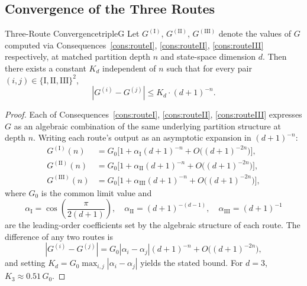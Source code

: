 \subsection{Convergence of the Three Routes}
\label{sec:ch20-convergence}
\label{sec:Grelation}

\begin{consequence}{Three-Route Convergence}{tripleG}
  Let $G^{(\mathrm{I})}$, $G^{(\mathrm{II})}$, $G^{(\mathrm{III})}$ denote the
  values of $G$ computed via Consequences~\ref{cons:routeI}, \ref{cons:routeII},
  \ref{cons:routeIII} respectively, at matched partition depth $n$ and
  state-space dimension $d$.
  Then there exists a constant $K_{d}$ independent of $n$ such that for every
  pair $(i,j) \in \{\mathrm{I},\mathrm{II},\mathrm{III}\}^{2}$,
  \begin{equation}\label{eq:tripleconvergence}
    \left|G^{(i)} - G^{(j)}\right| \leq K_{d}\cdot(d+1)^{-n}.
  \end{equation}
\end{consequence}

\begin{proof}
Each of Consequences~\ref{cons:routeI}, \ref{cons:routeII}, \ref{cons:routeIII}
expresses $G$ as an algebraic combination of the same underlying partition
structure at depth $n$.
Writing each route's output as an asymptotic expansion in $(d+1)^{-n}$:
\begin{align}
G^{(\mathrm{I})}(n) &= G_{0}\bigl[1+\alpha_{\mathrm{I}}(d+1)^{-n}
                      + O\!\bigl((d+1)^{-2n}\bigr)\bigr],\\
G^{(\mathrm{II})}(n) &= G_{0}\bigl[1+\alpha_{\mathrm{II}}(d+1)^{-n}
                       + O\!\bigl((d+1)^{-2n}\bigr)\bigr],\\
G^{(\mathrm{III})}(n) &= G_{0}\bigl[1+\alpha_{\mathrm{III}}(d+1)^{-n}
                        + O\!\bigl((d+1)^{-2n}\bigr)\bigr],
\end{align}
where $G_{0}$ is the common limit value and
\begin{equation}
  \alpha_{\mathrm{I}} = \cos\!\left(\frac{\pi}{2(d+1)}\right),\quad
  \alpha_{\mathrm{II}} = (d+1)^{-(d-1)},\quad
  \alpha_{\mathrm{III}} = (d+1)^{-1}
\end{equation}
are the leading-order coefficients set by the algebraic structure of each route.
The difference of any two routes is
\begin{equation}
  \left|G^{(i)}-G^{(j)}\right| = G_{0}|\alpha_{i}-\alpha_{j}|(d+1)^{-n}
                                 + O\!\bigl((d+1)^{-2n}\bigr),
\end{equation}
and setting $K_{d} = G_{0}\max_{i,j}|\alpha_{i}-\alpha_{j}|$ yields the stated
bound.
For $d = 3$, $K_{3} \approx 0.51\,G_{0}$.
\end{proof}

